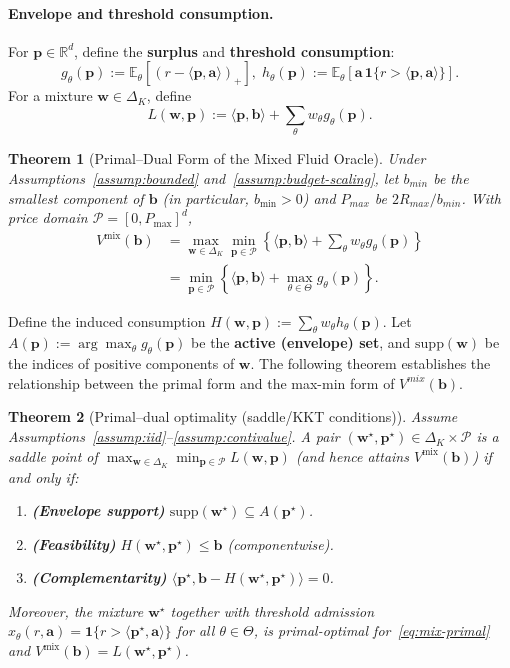 \documentclass[11pt]{article}
\newtheorem{theorem}{Theorem}
\newcommand{\bb}{\mathbf{b}}
\newcommand{\ba}{\mathbf{a}}
\newcommand{\bp}{\mathbf{p}}
\newcommand{\bw}{\mathbf{w}}
\newcommand{\E}{\mathbb{E}}
\newcommand{\cP}{\mathcal{P}}
\begin{document}
\paragraph{Envelope and threshold consumption.}
For $\bp\in\mathbb{R}^d$, define the \textbf{surplus} and \textbf{threshold consumption}:
\[
g_\theta(\bp):=\E_\theta[(r-\langle \bp,\ba\rangle)_+],\;
h_\theta(\bp):=\E_\theta[\ba\,\mathbf{1}\{r>\langle \bp,\ba\rangle\}].
\]
For a mixture $\bw\in\Delta_K$, define
\[
L(\bw,\bp):=\langle \bp,\bb\rangle+\sum_{\theta} w_\theta g_\theta(\bp).
\]
\begin{theorem}[Primal--Dual Form of the Mixed Fluid Oracle]
\label{thm:mix-dual}
Under Assumptions~\ref{assump:bounded} and~\ref{assump:budget-scaling}, let $b_{min}$ be the smallest component of $\bb$ (in particular, $b_{\min} > 0$) and $P_{max}$ be $2R_{max}/b_{min}$. With price domain $\cP = [0, P_{\max}]^d$,
\begin{equation}
\label{eq:mix-dual}
\begin{split}
V^{\mathrm{mix}}(\bb) &= \max_{\bw \in \Delta_K} \min_{\bp \in \cP} \left\{ \langle \bp, \bb \rangle + \sum_{\theta} w_\theta g_\theta(\bp) \right\} \\
&= \min_{\bp \in \cP} \left\{ \langle \bp, \bb \rangle + \max_{\theta \in \Theta} g_\theta(\bp) \right\}.
\end{split}
\end{equation}
\end{theorem}
Define the induced consumption $H(\bw,\bp):=\sum_{\theta} w_\theta h_\theta(\bp)$.
Let $A(\bp):=\arg\max_{\theta} g_\theta(\bp)$ be the \textbf{active (envelope) set}, and $\mathrm{supp}(\bw)$ be the indices of positive components of $\bw$. The following theorem establishes the relationship between the primal form and the max-min form of $V^{mix}(\bb)$.
\begin{theorem}[Primal--dual optimality (saddle/KKT conditions)]
\label{thm:pd_equilibrium}
Assume Assumptions~\ref{assump:iid}--\ref{assump:contivalue}.
A pair $(\bw^\star,\bp^\star)\in\Delta_K\times\cP$ is a saddle point of $\max_{\bw \in \Delta_K} \min_{\bp \in \cP}L(\bw,\bp)$
(and hence attains $V^{\mathrm{mix}}(\bb)$) if and only if:
\begin{enumerate}[label=(\roman*),leftmargin=*,noitemsep]
\item \textbf{(Envelope support)} $\mathrm{supp}(\bw^\star)\subseteq A(\bp^\star)$.
\item \textbf{(Feasibility)} $H(\bw^\star,\bp^\star)\le \bb$ (componentwise).
\item \textbf{(Complementarity)} $\langle \bp^\star,\bb-H(\bw^\star,\bp^\star)\rangle=0$.
\end{enumerate}
Moreover, the mixture $\bw^\star$ together with threshold admission $x_{\theta}(r,\ba)=\mathbf{1}\{r>\langle \bp^\star,\ba\rangle\}$ for all $\theta\in\Theta$,
 is primal-optimal for~\eqref{eq:mix-primal} and
$V^{\mathrm{mix}}(\bb)=L(\bw^\star,\bp^\star)$.
\end{theorem}
\end{document}
